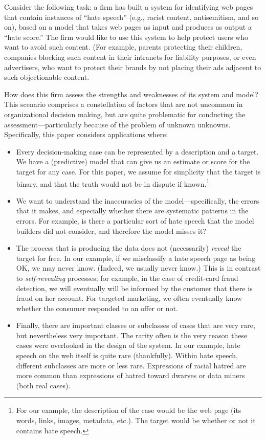 Consider the following task: a firm has built a system for identifying
web pages that contain instances of ``hate speech'' (e.g., racist
content, antisemitism, and so on), based on a model that takes web
pages as input and produces as output a ``hate score.''  The firm
would like to use this system to help protect users who want to avoid
such content. (For example, parents protecting their children, 
companies blocking such content in their intranets for liability purposes,
or even advertisers, who want to protect their brands by not placing
their ads adjacent to such objectionable content.  

How does this firm assess the strengths and weaknesses of its system
and model?  This scenario comprises a constellation of factors that
are not uncommon in organizational decision making, but are quite
problematic for conducting the assessment---particularly because of
the problem of unknown unknowns.  Specifically, this paper considers
applications where:

\begin{itemize}
\itemsep=0.0in
\item Every decision-making case can be represented by a description
  and a target.  We have a (predictive) model that can give us an estimate or
  score for the target for any case.  For this paper, we assume for
  simplicity that the target is binary, and that the truth would not
  be in dispute if known.\footnote{For our example, the
  description of the case would be the web page (its words, links,
  images, metadata, etc.).  The target would be whether or not it
  contains hate speech.}

\item We want to understand the inaccuracies of the
  model---specifically, the errors that it makes, and especially
  whether there are systematic patterns in the errors.  For example,
  is there a particular sort of hate speech that the model builders
  did not consider, and therefore the model misses it?

\item The process that is producing the data does not (necessarily)
  \textit{reveal} the target for free.  In our example, if we
  misclassify a hate speech page as being OK, we may never know.
  (Indeed, we usually never know.)  This is in contrast to
  \textit{self-revealing} processes; for example, in the case of credit-card
  fraud detection, we will eventually will be informed by the customer
  that there is fraud on her account.  For targeted marketing, we
  often eventually know whether the consumer responded to an offer or
  not.

\item Finally, there are important classes or subclasses of cases that
  are very rare, but nevertheless very important.  The rarity often is
  the very reason these cases were overlooked in the design of the
  system.  In our example, hate speech on the web itself is quite
  rare (thankfully).  Within hate speech, different subclasses are
  more or less rare.  Expressions of racial hatred are more common
  than expressions of hatred toward dwarves or data miners (both real cases).

\end{itemize}

